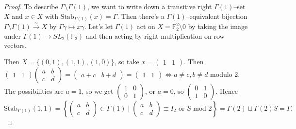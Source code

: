 \documentclass{article}
\theoremstyle{definition}
\begin{document}
\begin{proof}
    To describe $\Gamma\setminus \Gamma(1)$, we want to write down a transitive right $\Gamma(1)$--set $X$ and $x \in X$ with $\text{Stab}_{\Gamma(1)}(x) = \Gamma$. Then there's a $\Gamma(1)$--equivalent bijection $\Gamma\setminus \Gamma(1) \stackrel{\sim}{\to} X$ by $\Gamma \gamma \mapsto x \gamma$. Let's let $\Gamma(1)$ act on $X = \mathbb{F}^2_2\setminus 0$ by taking the image under $\Gamma(1) \to SL_2(\mathbb{F}_2)$ and then acting by right multiplication on row vectors. 
    \vspace{1mm}
     
    Then $X = \{(0,1), (1,1), (1,0)\}$, so take $x = \begin{pmatrix} 1&1 \end{pmatrix}$. Then $\begin{pmatrix} 1 &1 \end{pmatrix} \begin{pmatrix} a&b\\c&d \end{pmatrix}=\begin{pmatrix} a+c&b+d \end{pmatrix} = \begin{pmatrix} 1&1 \end{pmatrix}\iff a \neq c, b \neq d$ modulo 2. The possibilities are $a = 1$, so we get $\begin{pmatrix} 1&0\\0&1 \end{pmatrix}$, or $a=0$, so $\begin{pmatrix} 0 & 1\\1&0 \end{pmatrix}$. Hence 
    $$\text{Stab}_{\Gamma(1)}(1,1) = \left\{\begin{pmatrix} a&b\\c&d \end{pmatrix} \in \Gamma(1) \mid \begin{pmatrix} a &b\\c&d \end{pmatrix} \equiv I_2 \text{ or }S \text{ mod }2\right\} = \Gamma(2) \sqcup \Gamma(2)S = \Gamma.$$

\end{proof}
\end{document}
